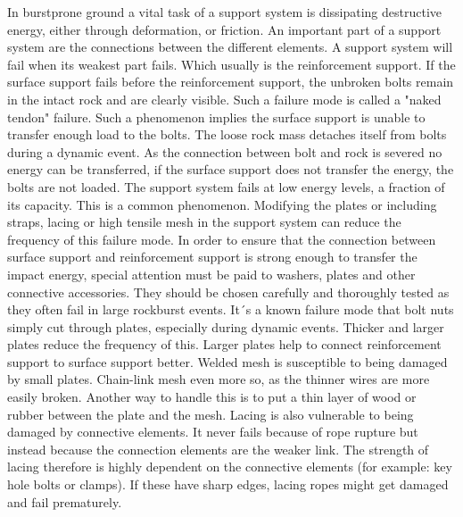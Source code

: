 In burstprone ground a vital task of a support system is dissipating destructive energy, either through deformation, or friction. An important part of a support system are the connections between the different elements. \autocite[2.17]{canada96}\autocite[220]{Kaiser12} A support system will fail when its weakest part fails. Which usually is the reinforcement support. \autocite{Potvin10} \autocite[221]{Kaiser12} 
\autocite[13]{Simser07} If the surface support fails before the reinforcement support, the unbroken bolts remain in the intact rock and are clearly visible. Such a failure mode is called a "naked tendon" failure. \autocite{Potvin10} Such a phenomenon implies the surface support is unable to transfer enough load to the bolts. The loose rock mass detaches itself from bolts during a dynamic event. As the connection between bolt and rock is severed no energy can be transferred, if the surface support does not transfer the energy, the bolts are not loaded. \autocite[7]{guler01} The support system fails at low energy levels, a fraction of its capacity. \autocite[240]{Potvin10}
This is a common phenomenon. Modifying the plates or including straps, lacing or high tensile mesh in the support system can reduce the frequency of this failure mode. \autocite[1]{Simser07} \autocite[240]{Potvin10} 
In order to ensure that the connection between surface support and reinforcement support is strong enough to transfer the impact energy, special attention must be paid to washers, plates and other connective accessories. They should be chosen carefully and thoroughly tested as they often fail in large rockburst events. It´s a known failure mode that bolt nuts simply cut through plates, especially during dynamic events. Thicker and larger plates reduce the frequency of this. \autocite[3]{Simser07}
Larger plates help to connect reinforcement support to surface support better.  Welded mesh is susceptible to being damaged by small plates. \autocite[218]{Heal10} Chain-link mesh even more so, as the thinner wires are more easily broken. \autocite{chainlink11}
Another way to handle this is to  put a thin layer of wood or rubber between the plate and the mesh. \autocite[3]{Simser07}
 Lacing is also vulnerable to being damaged by connective elements. It never fails because of rope rupture but instead because the connection elements are the weaker link. \autocite[4.33]{canada96} The strength of lacing therefore is highly dependent on the connective elements (for example: key hole bolts or clamps). If these have sharp edges, lacing ropes might get damaged and fail prematurely. \autocite[3]{guler01} 

